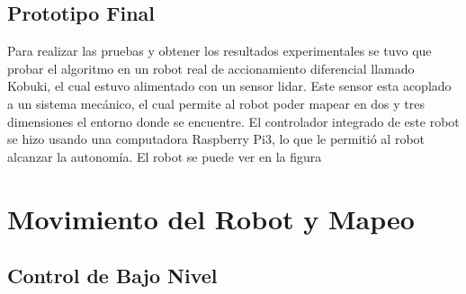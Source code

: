 \subsection{Prototipo Final}
Para realizar las pruebas y obtener los resultados experimentales se tuvo que probar
el algoritmo en un robot real de accionamiento diferencial llamado Kobuki, el cual estuvo 
alimentado con un sensor lidar. Este sensor esta acoplado a un sistema mec\'anico, el cual
permite al robot poder mapear en dos y tres dimensiones el entorno donde se encuentre. El 
controlador integrado de este robot se hizo usando una computadora Raspberry Pi3, lo que le
permiti\'o al robot alcanzar la autonom\'ia. El robot se puede ver en la figura 

\section{Movimiento del Robot y Mapeo}

\subsection{Control de Bajo Nivel}


